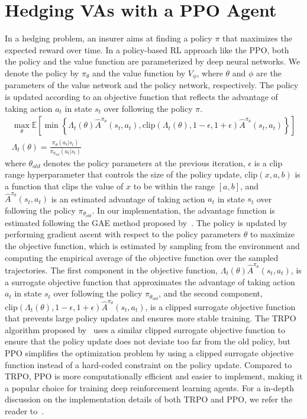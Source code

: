 \section{Hedging VAs with a PPO Agent} \label{sec:PPO}
In a hedging problem, an insurer aims at finding a policy $\pi$ that maximizes the expected reward over time.
In a policy-based RL approach like the PPO, both the policy and the value function are parameterized by deep neural networks.
We denote the policy by $\pi_{\theta}$ and the value function by $V_{\phi}$, where $\theta$ and $\phi$ are the parameters of the value network and the policy network, respectively.
The policy is updated according to an objective function that reflects the advantage of taking action $a_t$ in state $s_t$ over following the policy $\pi$.
\begin{align}
    \max_{\theta} \mathbb{E}\left[ \min \left\{ \Lambda_t(\theta)\hat{A}^{\pi_{\theta}}(s_t, a_t), \text{clip}(\Lambda_t(\theta), 1-\epsilon, 1 + \epsilon) \hat{A}^{\pi_{\theta}}(s_t, a_t)  \right\} \right] \\
    \Lambda_t(\theta) = \frac{\pi_{\theta}(a_t|s_t)}{\pi_{\theta_{old}}(a_t|s_t)} 
\end{align}
where $\theta_{old}$ denotes the policy parameters at the previous iteration, $\epsilon$ is a clip range hyperparameter that controls the size of the policy update, $\text{clip}(x, a, b)$ is a function that clips the value of $x$ to be within the range $[a, b]$, and $\hat{A}^{\pi_{\theta}}(s_t, a_t)$ is an estimated advantage of taking action $a_t$ in state $s_t$ over following the policy $\pi_{\theta_{old}}$.
In our implementation, the advantage function is estimated following the GAE method proposed by~\cite{schulman2015high}.
The policy is updated by performing gradient ascent with respect to the policy parameters $\theta$ to maximize the objective function, which is estimated by sampling from the environment and computing the empirical average of the objective function over the sampled trajectories.
The first component in the objective function, $\Lambda_t(\theta) \hat{A}^{\pi_{\theta}}(s_t, a_t)$, is a surrogate objective function that approximates the advantage of taking action $a_t$ in state $s_t$ over following the policy $\pi_{\theta_{old}}$, and the second component, $\text{clip}(\Lambda_t(\theta), 1-\epsilon, 1 + \epsilon) \hat{A}^{\pi_{\theta}}(s_t, a_t)$, is a clipped surrogate objective function that prevents large policy updates and ensures more stable training.
The TRPO algorithm proposed by~\cite{schulman2015trust} uses a similar clipped surrogate objective function to ensure that the policy update does not deviate too far from the old policy, but PPO simplifies the optimization problem by using a clipped surrogate objective function instead of a hard-coded constraint on the policy update.
Compared to TRPO, PPO is more computationally efficient and easier to implement, making it a popular choice for training deep reinforcement learning agents.
For a in-depth discussion on the implementation details of both TRPO and PPO, we refer the reader to~\cite{engstrom2020implementation}.

